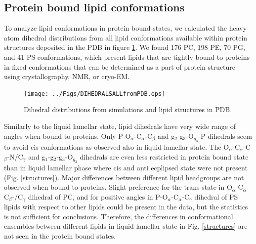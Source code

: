 \documentclass[aps,prl,superscriptaddress,twocolumn]{revtex4}
\begin{document}
\subsection{Protein bound lipid conformations}

To analyze lipid conformations in protein bound states,
we calculated the heavy atom dihedral distributions from 
all lipid conformations available within protein structures
deposited in the PDB \cite{berman00} in figure \ref{dihedralsFROMpdb}.
We found 176 PC, 198 PE, 70 PG, and 41 PS conformations, which
present lipids that are tightly bound to proteins in fixed conformations
that can be determined as a part of protein structure using crystallography, NMR, or cryo-EM. 


\begin{figure}[]
  \centering
  \texttt{[image: ../Figs/DIHEDRALSALLfromPDB.eps]}
  \caption{\label{dihedralsFROMpdb}
    Dihedral distributions from simulations and lipid structures in PDB.
  }
\end{figure}

Similarly to the liquid lamellar state, lipid dihedrals have very wide range of angles
when bound to proteins. Only %
P-O$_\alpha$-C$_\alpha$-C$_\beta$ and g$_2$-g$_3$-O$_{g_3}$-P dihedrals
seem to avoid cis conformations as observed also in liquid lamellar state.
The %
O$_\alpha$-C$_\alpha$-C$_\beta$-N/C$_\gamma$ and
g$_1$-g$_2$-g$_3$-O$_{g_3}$ dihedrals are even less restricted in protein bound state
than in liquid lamellar phase where cis and anti ecplipsed state were not present (Fig. \ref{structures}). 
Major differences between different lipid headgroups are not observed when bound to proteins.
Slight preference for the trans state in O$_\alpha$-C$_\alpha$-C$_\beta$-/C$_\gamma$ dihedral of PC,
and for positive angles in P-O$_\alpha$-C$_\alpha$-C$_\gamma$ dihedral of PS lipids with respect
to other lipids could be present in the data, but the statistics is not sufficient for conclusions.
Therefore, the differences in conformational ensembles between different
lipids in liquid lamellar state in Fig. \ref{structures} are not seen in the protein bound states.
\end{document}

